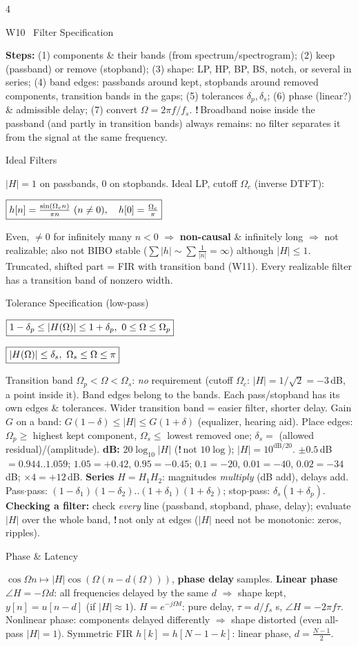 \documentclass[a4paper,landscape]{article}
\newcommand{\sect}[1]{\par\vspace{1pt}\noindent\colorbox{secblue}{\parbox{\dimexpr\linewidth-2\fboxsep}{\color{white}\bfseries\fontsize{6.8}{7.6}\selectfont\strut #1}}\par\vspace{0.4pt}}
\newcommand{\sub}[1]{\par\vspace{0.6pt}\noindent\colorbox{subblue}{\parbox{\dimexpr\linewidth-2\fboxsep}{\bfseries\strut #1}}\par\vspace{0.2pt}}
\newcommand{\warn}[1]{{\color{warnred}\textbf{!}\,#1}}
\newcommand{\bx}[1]{\fbox{$\textstyle #1$}}
\newcommand{\eqc}[1]{\par\vspace{0.2pt}\centerline{$#1$}\par\vspace{0.2pt}}
\begin{document}
\begin{multicols*}{4}
\sect{W10 \ Filter Specification}
\textbf{Steps:} (1) components \& their bands (from spectrum/spectrogram); (2) keep (passband) or remove (stopband); (3) shape: LP, HP, BP, BS, notch, or several in series; (4) band edges: passbands around kept, stopbands around removed components, transition bands in the gaps; (5) tolerances $\delta_p,\delta_s$; (6) phase (linear?) \& admissible delay; (7) convert $\Omega=2\pi f/f_s$.
\warn{Broadband noise inside the passband (and partly in transition bands) always remains: no filter separates it from the signal at the same frequency.}
\sub{Ideal Filters}
$|H|=1$ on passbands, $0$ on stopbands. Ideal LP, cutoff $\Omega_c$ (inverse DTFT):
\eqc{\bx{h[n]=\frac{\sin(\Omega_cn)}{\pi n}\ (n\ne0),\quad h[0]=\frac{\Omega_c}{\pi}}}
Even, $\ne0$ for infinitely many $n<0$ $\Rightarrow$ \textbf{non-causal} \& infinitely long $\Rightarrow$ not realizable; also not BIBO stable ($\sum|h|\sim\sum\frac1{|n|}=\infty$) although $|H|\le1$. Truncated, shifted part = FIR with transition band (W11). Every realizable filter has a transition band of nonzero width.
\sub{Tolerance Specification (low-pass)}
\eqc{\bx{1-\delta_p\le|H(\Omega)|\le1+\delta_p,\ 0\le\Omega\le\Omega_p}}
\eqc{\bx{|H(\Omega)|\le\delta_s,\ \Omega_s\le\Omega\le\pi}}
Transition band $\Omega_p<\Omega<\Omega_s$: \emph{no} requirement (cutoff $\Omega_c$: $|H|=1/\sqrt2=-3$\,dB, a point inside it). Band edges belong to the bands. Each pass/stopband has its own edges \& tolerances. Wider transition band = easier filter, shorter delay. Gain $G$ on a band: $G(1-\delta)\le|H|\le G(1+\delta)$ (equalizer, hearing aid).
Place edges: $\Omega_p\ge$ highest kept component, $\Omega_s\le$ lowest removed one; $\delta_s=$ (allowed residual)/(amplitude).
\textbf{dB:} $20\log_{10}|H|$ (\warn{not $10\log$}); $|H|=10^{\text{dB}/20}$. $\pm0.5$\,dB $=0.944..1.059$; $1.05=+0.42$, $0.95=-0.45$; $0.1=-20$, $0.01=-40$, $0.02=-34$\,dB; $\times4=+12$\,dB.
\textbf{Series} $H=H_1H_2$: magnitudes \emph{multiply} (dB add), delays add. Pass$\cdot$pass: $(1{-}\delta_1)(1{-}\delta_2)..(1{+}\delta_1)(1{+}\delta_2)$; stop$\cdot$pass: $\delta_s(1+\delta_p)$.
\textbf{Checking a filter:} check \emph{every} line (passband, stopband, phase, delay); evaluate $|H|$ over the whole band, \warn{not only at edges} ($|H|$ need not be monotonic: zeros, ripples).
\sub{Phase \& Latency}
$\cos\Omega n\mapsto|H|\cos(\Omega(n-d(\Omega)))$, \textbf{phase delay} \bx{d(\Omega)=-\angle H(\Omega)/\Omega} samples.
\textbf{Linear phase} $\angle H=-\Omega d$: all frequencies delayed by the same $d$ $\Rightarrow$ shape kept, $y[n]=u[n{-}d]$ (if $|H|\approx1$). $H=e^{-j\Omega d}$: pure delay, $\tau=d/f_s$ s, $\angle H=-2\pi f\tau$. Nonlinear phase: components delayed differently $\Rightarrow$ shape distorted (even all-pass $|H|=1$). Symmetric FIR $h[k]=h[N{-}1{-}k]$: linear phase, $d=\frac{N-1}2$.

\end{multicols*}
\end{document}
